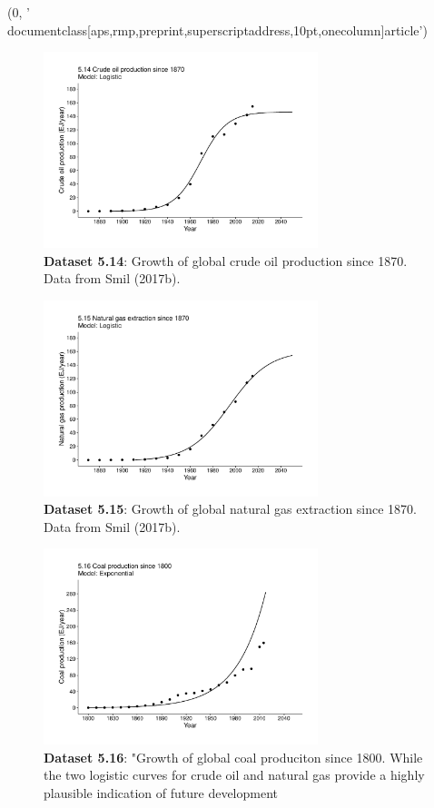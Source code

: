 (0, '\\documentclass[aps,rmp,preprint,superscriptaddress,10pt,onecolumn]{article}\n')
\begin{document}
\begin{figure}[h]
\includegraphics[width=8cm]{output/figs-ggplot/5.14.pdf}
\caption{\textbf{Dataset 5.14}: Growth of global crude oil production since 1870. Data from Smil (2017b).}
\end{figure}
	
\begin{figure}[h]
\includegraphics[width=8cm]{output/figs-ggplot/5.15.pdf}
\caption{\textbf{Dataset 5.15}: Growth of global natural gas extraction since 1870. Data from Smil (2017b).}
\end{figure}
	
\begin{figure}[h]
\includegraphics[width=8cm]{output/figs-ggplot/5.16.pdf}
\caption{\textbf{Dataset 5.16}: "Growth of global coal produciton since 1800. While the two logistic curves for crude oil and natural gas provide a highly plausible indication of future development}
\end{figure}
	
\end{document}
